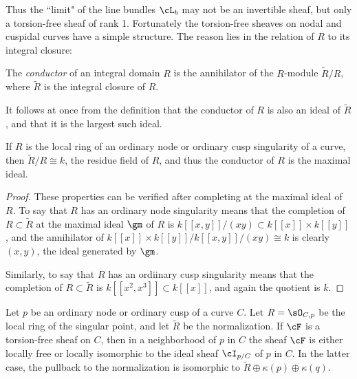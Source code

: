 Thus the ``limit" of the line bundles $\cL_b$ may not be an invertible sheaf, but only a torsion-free sheaf of rank 1. Fortunately the torsion-free sheaves on nodal and cuspidal curves have a simple structure. The reason lies in the relation of $R$ to its integral closure:

\begin{definition}
The \emph{conductor} of an integral domain $R$ is the annihilator of the $R$-module
$\widetilde R/R$, where $\widetilde R$ is the integral closure of $R$.
\end{definition}

It follows at once from the definition that the conductor of $R$ is also an ideal of $\widetilde R$, and that it is the largest such ideal.

\begin{proposition}
If $R$ is the local ring of an ordinary node or ordinary cusp singularity of a curve, then  $\widetilde R/R \cong k$, the residue field of $R$, and thus the conductor of $R$ is the
maximal ideal. 
\end{proposition}

\begin{proof} These properties can be verified after completing at the maximal ideal of $R$.
To say that $R$ has an ordinary node singularity means that the completion of $R \subset \widetilde R$ at the maximal ideal $\gm$ of $R$ is $k[[x,y]]/(xy)\subset k[[x]]\times k[[y]]$, and 
the annihilator of $k[[x]]\times k[[y]]/k[[x,y]]/(xy) \cong k$ is clearly $(x,y)$, the ideal generated by $\gm$.

Similarly, to say that $R$ has an ordiinary cusp singularity means that the completion of 
$R \subset \widetilde R$ is $k[[x^2,x^3]]\subset k[[x]]$, and again the quotient is $k$.
\end{proof}

\begin{lemma}\label{torsion free at node}
Let $p$ be an ordinary node or ordinary cusp of a curve $C$. Let $R = \sO_{C,p}$ be the local ring of the singular point,
and let $\tilde R$ be the normalization.  If $\cF$ is a torsion-free sheaf on $C$, then in a neighborhood of $p$ in $C$ the sheaf $\cF$ is either locally free or locally isomorphic to the ideal sheaf $\cI_{p/C}$ of $p$ in $C$.
In the latter case, the pullback to the normalization is isomorphic to $\tilde R\oplus \kappa(p) \oplus \kappa(q)$.
\end{lemma}

